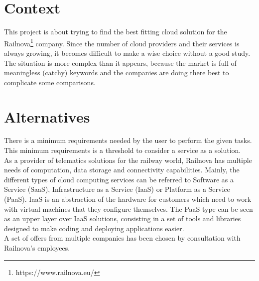 \documentclass[a4paper,11pt]{article}
\begin{document}
\section{Context}
This project is about trying to find the best fitting cloud solution for the Railnova\footnote{https://www.railnova.eu/} company. Since the number of cloud providers and their services is always growing, it becomes difficult to make a wise choice without a good study. The situation is more complex than it appears, because the market is full of meaningless (catchy) keywords and the companies are doing there best to complicate some comparisons.


\section{Alternatives}
There is a minimum requirements needed by the user to perform the given tasks. This minimum requirements is a threshold to consider a service as a solution.\\

As a provider of telematics solutions for the railway world, Railnova has multiple needs of computation, data storage and connectivity capabilities. Mainly, the different types of cloud computing services can be referred to Software as a Service (SaaS), Infrastructure as a Service (IaaS) or Platform as a Service (PaaS). IaaS is an abstraction of the hardware for customers which need to work with virtual machines that they configure themselves. The PaaS type can be seen as an upper layer over IaaS solutions, consisting in a set of tools and libraries designed to make coding and deploying applications easier.\\

A set of offers from multiple companies has been chosen by consultation with Railnova's employees. 
\end{document}
